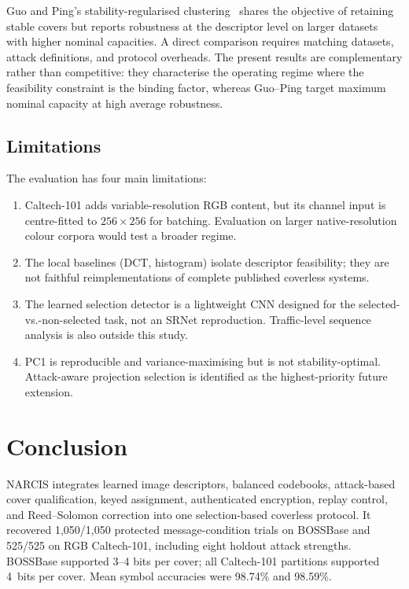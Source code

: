 ﻿\documentclass[10pt,journal]{IEEEtran}
\newcommand{\method}{NARCIS\xspace}
\begin{document}
Guo and Ping's stability-regularised clustering~\cite{guo2026capacity}
shares the objective of retaining stable covers but reports robustness
at the descriptor level on larger datasets with higher nominal
capacities. A direct comparison requires matching datasets, attack
definitions, and protocol overheads. The present results are
complementary rather than competitive: they characterise the
operating regime where the feasibility constraint is the binding
factor, whereas Guo--Ping target maximum nominal capacity at high
average robustness.

\subsection{Limitations}

The evaluation has four main limitations:
\begin{enumerate}
\item Caltech-101 adds variable-resolution RGB content, but its channel
input is centre-fitted to $256\times256$ for batching. Evaluation on
larger native-resolution colour corpora would test a broader regime.
\item The local baselines (DCT, histogram) isolate descriptor feasibility;
they are not faithful reimplementations of complete published coverless
systems.
\item The learned selection detector is a lightweight CNN designed for
the selected-vs.-non-selected task, not an SRNet reproduction.
Traffic-level sequence analysis is also outside this study.
\item PC1 is reproducible and variance-maximising but is not stability-optimal.
Attack-aware projection selection is identified as the highest-priority
future extension.
\end{enumerate}

\section{Conclusion}
\label{sec:conclusion}

\method integrates learned image descriptors, balanced codebooks,
attack-based cover qualification, keyed assignment, authenticated
encryption, replay control, and Reed--Solomon correction into one
selection-based coverless protocol. It recovered 1{,}050/1{,}050
protected message-condition trials on BOSSBase and 525/525 on RGB
Caltech-101, including eight holdout attack strengths. BOSSBase
supported 3--4 bits per cover; all Caltech-101 partitions supported
4~bits per cover. Mean symbol accuracies were 98.74\% and 98.59\%.
\end{document}
